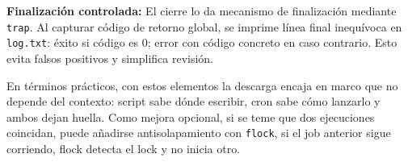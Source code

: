 \textbf{Finalización controlada:} El cierre lo da mecanismo de finalización mediante \texttt{trap}. Al capturar código de retorno global, se imprime línea final inequívoca en \texttt{log.txt}: éxito si código es 0; error con código concreto en caso contrario. Esto evita falsos positivos y simplifica revisión.

En términos prácticos, con estos elementos la descarga encaja en marco que no depende del contexto: script sabe dónde escribir, cron sabe cómo lanzarlo y ambos dejan huella. Como mejora opcional, si se teme que dos ejecuciones coincidan, puede añadirse antisolapamiento con \texttt{flock}, si el job anterior sigue corriendo, flock detecta el lock y no inicia otro.

